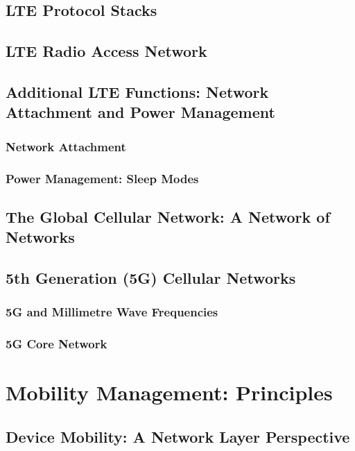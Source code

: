 \documentclass[12pt letter]{report}
\begin{document}
\section{LTE Protocol Stacks}

\section{LTE Radio Access Network}

\section{Additional LTE Functions: Network Attachment and Power Management}

\subsection{Network Attachment}

\subsection{Power Management: Sleep Modes}

\section{The Global Cellular Network: A Network of Networks}

\section{5th Generation (5G) Cellular Networks}

\subsection{5G and Millimetre Wave Frequencies}

\subsection{5G Core Network}

\chapter{Mobility Management: Principles}

\section{Device Mobility: A Network Layer Perspective}
\end{document}
